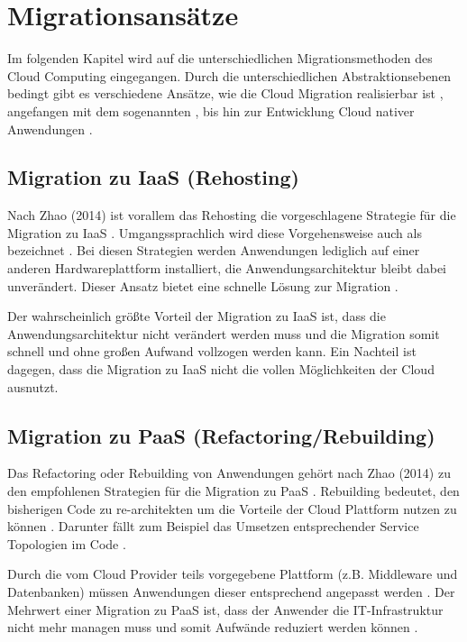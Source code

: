 \section{Migrationsansätze}
\label{sec:migrationsansaetze}

Im folgenden Kapitel wird auf die unterschiedlichen Migrationsmethoden des Cloud Computing eingegangen. Durch die unterschiedlichen Abstraktionsebenen bedingt gibt es verschiedene Ansätze, wie die Cloud Migration realisierbar ist \cite[Vgl.][S. 226]{Surianarayanan2019}, angefangen mit dem sogenannten \grqq{}, bis hin zur Entwicklung Cloud nativer Anwendungen \cite[Vgl.][S. 144]{Zhao2014}.

\subsection{Migration zu IaaS (Rehosting)}
Nach Zhao (2014) ist vorallem das Rehosting die vorgeschlagene Strategie für die Migration zu \ac{IaaS} \cite[Vgl.][S. 144]{Zhao2014}. Umgangssprachlich wird diese Vorgehensweise auch als \grqq{} bezeichnet \cite[Vgl.][]{NetApp}. Bei diesen Strategien werden Anwendungen lediglich auf einer anderen Hardwareplattform installiert, die Anwendungsarchitektur bleibt dabei unverändert. Dieser Ansatz bietet eine schnelle Lösung zur Migration \cite[Vgl.][]{CIO}.

Der wahrscheinlich größte Vorteil der Migration zu \ac{IaaS} ist, dass die Anwendungsarchitektur nicht verändert werden muss und die Migration somit schnell und ohne großen Aufwand vollzogen werden kann. Ein Nachteil ist dagegen, dass die Migration zu \ac{IaaS} nicht die vollen Möglichkeiten der Cloud ausnutzt.

\subsection{Migration zu PaaS (Refactoring/Rebuilding)}
Das Refactoring oder Rebuilding von Anwendungen gehört nach Zhao (2014) zu den empfohlenen Strategien für die Migration zu \ac{PaaS} \cite[Vgl.][S. 144]{Zhao2014}. Rebuilding bedeutet, den bisherigen Code zu re-architekten um die Vorteile der Cloud Plattform nutzen zu können \cite[Vgl.][]{CIO}. Darunter fällt zum Beispiel das Umsetzen entsprechender Service Topologien im Code \cite[Vgl.][S. 2]{Holmes2018}.

Durch die vom Cloud Provider teils vorgegebene Plattform (z.B. Middleware und Datenbanken) müssen Anwendungen dieser entsprechend angepasst werden \cite[Vgl.][S. 227]{Surianarayanan2019}. Der Mehrwert einer Migration zu \ac{PaaS} ist, dass der Anwender die IT-Infrastruktur nicht mehr managen muss und somit Aufwände reduziert werden können \cite[Vgl.][S. 6]{Pahl}.

